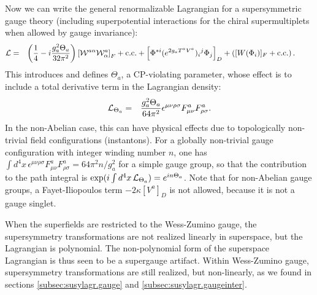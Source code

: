 \documentclass[11pt]{article}
\def\beq{\begin{eqnarray}}
\def\eeq{\end{eqnarray}}
\begin{document}
Now we can write the general renormalizable Lagrangian for a supersymmetric gauge theory (including superpotential interactions for the chiral supermultiplets when allowed by gauge invariance):
\beq
{\cal L} &=& \left ( \frac{1}{4}  - i \frac{g_a^2 \Theta_a}{32 \pi^2} 
\right ) 
\left [
{\cal W}^{a\alpha} {\cal W}^a_\alpha 
\right ]_F
+ {\rm c.c.}
+
\left [
\Phi^{*i} (e^{2g_a T^a V^a})_i{}^j \Phi_j \right]_D
+ 
\left ( [W(\Phi_i)]_F + {\rm c.c.} \right ) .
\phantom{xxxx}
\eeq
This introduces and defines 
$\Theta_a$, a CP-violating parameter, whose effect is to include a total derivative term
in the Lagrangian density:
\beq
{\cal L}_{\Theta_a} &=& 
\frac{g_a^2 \Theta_a}{64\pi^2} \epsilon^{\mu\nu\rho\sigma} F^a_{\mu\nu} F^a_{\rho\sigma}.
\eeq
In the non-Abelian case, this can have physical
effects due to topologically non-trivial field configurations (instantons). 
For a globally non-trivial
gauge configuration with integer winding number $n$, one has 
$\int d^4 x\, \epsilon^{\mu\nu\rho\sigma} F^a_{\mu\nu} F^a_{\rho\sigma} 
= 64 \pi^2 n/g_a^2$ for a simple gauge group,
so that the contribution to the path integral is 
$\exp({i\int d^4 x\,{\cal L}_{\scriptstyle \Theta_a}})
=e^{i n \Theta_a}$.
Note that for non-Abelian gauge groups, a Fayet-Iliopoulos term $-2\kappa [V^a]_D$ is not 
allowed, because it is not a gauge singlet.

When the superfields are restricted to the Wess-Zumino gauge, the supersymmetry transformations 
are not realized linearly in superspace, but the Lagrangian is polynomial. The 
non-polynomial form of the superspace Lagrangian is thus seen to be a supergauge artifact. 
Within Wess-Zumino gauge, supersymmetry transformations are still realized, but 
non-linearly, as we found in sections \ref{subsec:susylagr.gauge} and 
\ref{subsec:susylagr.gaugeinter}.
\end{document}
